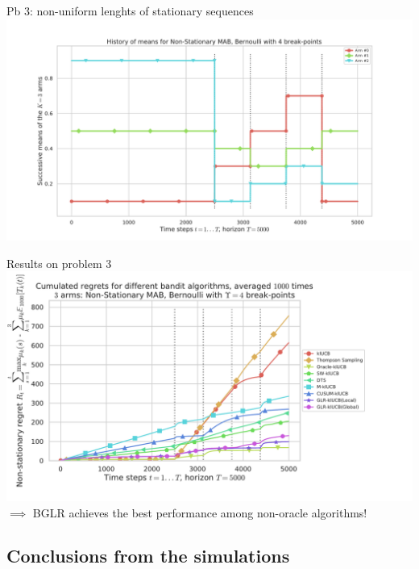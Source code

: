 \documentclass[11pt,english,ignorenonframetext,]{beamer}
\begin{document}
\begin{frame}[plain]{Pb 3: non-uniform lenghts of stationary sequences}
  \centering
  \includegraphics[width=1.00\textwidth]{figures/Problem_4.pdf}
\end{frame}

\begin{frame}[plain]{Results on problem 3}
  \centering
  \includegraphics[width=1.15\textwidth]{figures/regret_problem4.pdf}
  $\implies$ BGLR achieves the best performance among non-oracle algorithms!
\end{frame}


\subsection{\hfill{}Conclusions from the simulations\hfill{}}
\end{document}
